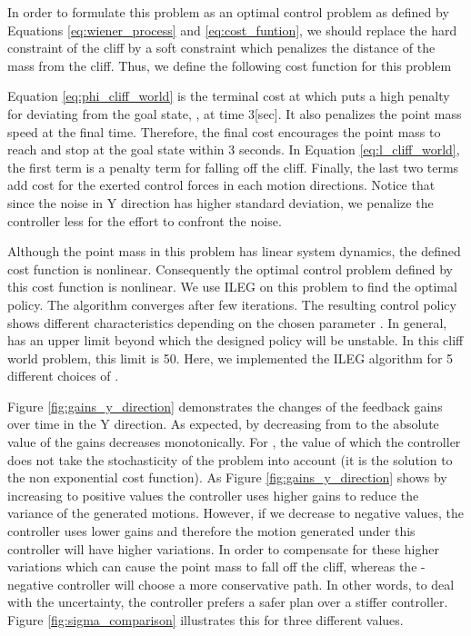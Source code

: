 \documentclass[letterpaper, 10 pt, conference]{ieeeconf}
\begin{document}
In order to formulate this problem as an optimal control problem as defined by 
Equations \eqref{eq:wiener_process} and \eqref{eq:cost_funtion}, we should
replace the hard constraint of the cliff by a soft constraint which penalizes the
distance of the mass from the cliff. Thus, we define the following cost function
for this problem
 
Equation \eqref{eq:phi_cliff_world} is the terminal cost at  which puts a
high penalty for deviating from the goal state, , at time 3[sec]. It
also penalizes the point mass speed at the final time. Therefore, the final cost
encourages the point mass to reach and stop at the goal state within 3 seconds.
In Equation \eqref{eq:l_cliff_world}, the first term is a penalty term for
falling off the cliff. Finally, the last two terms add cost for the exerted
control forces in each motion directions. Notice that since the noise in Y
direction has higher standard deviation, we penalize the controller less for the
effort to confront the noise.

Although the point mass in this problem has linear system dynamics, the defined
cost function is nonlinear. Consequently the optimal control problem defined by
this cost function is nonlinear. We use ILEG on this problem to find the optimal
policy. The algorithm converges after few iterations. The resulting control
policy shows different characteristics depending on the chosen parameter 
. In general,  has an upper limit beyond which the designed
policy will be unstable. In this cliff world problem, this limit is 50. Here, we
implemented the ILEG algorithm for 5 different choices of .

Figure \ref{fig:gains_y_direction} demonstrates the changes of the feedback gains
over time in the Y direction. As expected, by decreasing  from
 to  the absolute value of the gains decreases
monotonically. For , the value of  which the controller does
not take the stochasticity of the problem into account (it is the solution to the
non exponential cost function). As Figure \ref{fig:gains_y_direction} shows by
increasing  to positive values the controller uses higher gains to reduce
the variance of the generated motions. However, if we decrease  to
negative values, the controller uses lower gains and therefore the motion
generated under this controller will have higher variations. In order to
compensate for these higher variations which can cause the point mass to fall off
the cliff, whereas the -negative controller will choose a more
conservative path. In other words, to deal with the uncertainty, the controller
prefers a safer plan over a stiffer controller. Figure \ref{fig:sigma_comparison}
illustrates this for three different  values.
\end{document}
